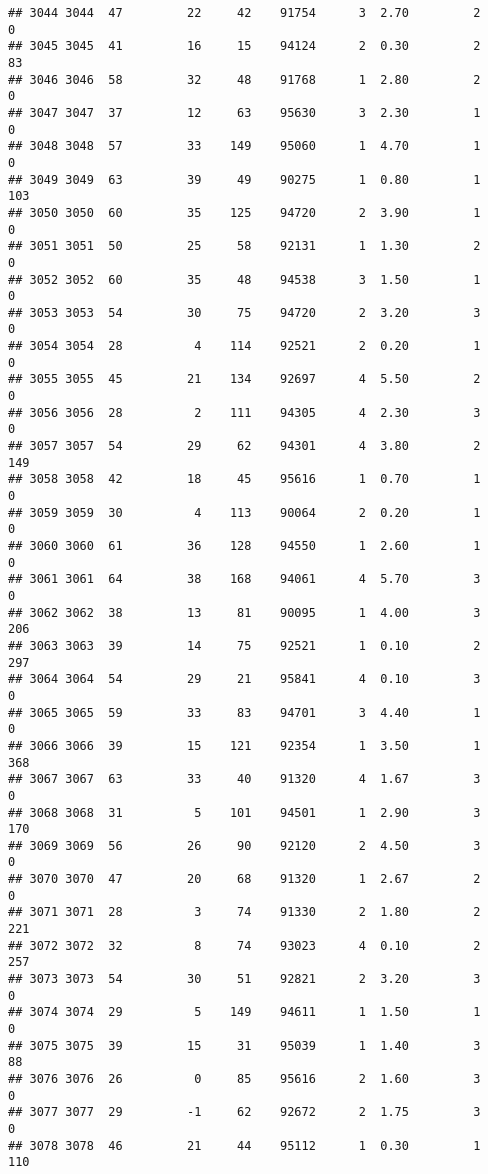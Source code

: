 \documentclass[
]{article}
\begin{document}
\begin{verbatim}
## 3044 3044  47         22     42    91754      3  2.70         2        0
## 3045 3045  41         16     15    94124      2  0.30         2       83
## 3046 3046  58         32     48    91768      1  2.80         2        0
## 3047 3047  37         12     63    95630      3  2.30         1        0
## 3048 3048  57         33    149    95060      1  4.70         1        0
## 3049 3049  63         39     49    90275      1  0.80         1      103
## 3050 3050  60         35    125    94720      2  3.90         1        0
## 3051 3051  50         25     58    92131      1  1.30         2        0
## 3052 3052  60         35     48    94538      3  1.50         1        0
## 3053 3053  54         30     75    94720      2  3.20         3        0
## 3054 3054  28          4    114    92521      2  0.20         1        0
## 3055 3055  45         21    134    92697      4  5.50         2        0
## 3056 3056  28          2    111    94305      4  2.30         3        0
## 3057 3057  54         29     62    94301      4  3.80         2      149
## 3058 3058  42         18     45    95616      1  0.70         1        0
## 3059 3059  30          4    113    90064      2  0.20         1        0
## 3060 3060  61         36    128    94550      1  2.60         1        0
## 3061 3061  64         38    168    94061      4  5.70         3        0
## 3062 3062  38         13     81    90095      1  4.00         3      206
## 3063 3063  39         14     75    92521      1  0.10         2      297
## 3064 3064  54         29     21    95841      4  0.10         3        0
## 3065 3065  59         33     83    94701      3  4.40         1        0
## 3066 3066  39         15    121    92354      1  3.50         1      368
## 3067 3067  63         33     40    91320      4  1.67         3        0
## 3068 3068  31          5    101    94501      1  2.90         3      170
## 3069 3069  56         26     90    92120      2  4.50         3        0
## 3070 3070  47         20     68    91320      1  2.67         2        0
## 3071 3071  28          3     74    91330      2  1.80         2      221
## 3072 3072  32          8     74    93023      4  0.10         2      257
## 3073 3073  54         30     51    92821      2  3.20         3        0
## 3074 3074  29          5    149    94611      1  1.50         1        0
## 3075 3075  39         15     31    95039      1  1.40         3       88
## 3076 3076  26          0     85    95616      2  1.60         3        0
## 3077 3077  29         -1     62    92672      2  1.75         3        0
## 3078 3078  46         21     44    95112      1  0.30         1      110

\end{verbatim}
\end{document}
